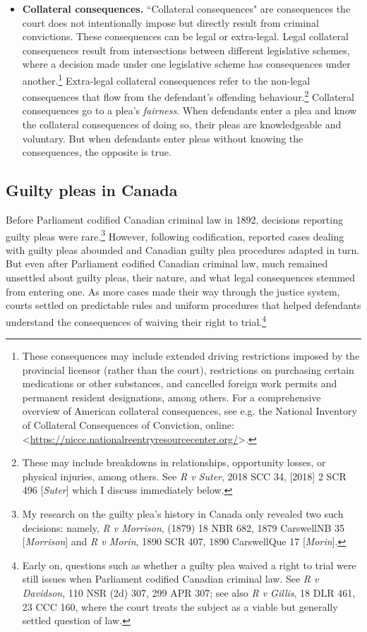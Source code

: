 \begin{itemize}
\item \textbf{Collateral consequences.} ``Collateral consequences" are consequences the court does not intentionally impose but directly result from criminal convictions. These consequences can be legal or extra-legal. Legal collateral consequences result from intersections between different legislative schemes, where a decision made under one legislative scheme has consequences under another.\footnote{These consequences may include extended driving restrictions imposed by the provincial licensor (rather than the court), restrictions on purchasing certain medications or other substances, and cancelled foreign work permits and permanent resident designations, among others. For a comprehensive overview of American collateral consequences, see e.g. the National Inventory of Collateral Consequences of Conviction, online: \textless \url{https://niccc.nationalreentryresourcecenter.org/}\textgreater.} Extra-legal collateral consequences refer to the non-legal consequences that flow from the defendant's offending behaviour.\footnote{These may include breakdowns in relationships, opportunity losses, or physical injuries, among others. See \textit{R v Suter}, 2018 SCC 34, [2018] 2 SCR 496 [\textit{Suter}] which I discuss immediately below.} Collateral consequences go to a plea's \textit{fairness}. When defendants enter a plea and know the collateral consequences of doing so, their pleas are knowledgeable and voluntary. But when defendants enter pleas without knowing the consequences, the opposite is true.
\end{itemize}

\subsection{Guilty pleas in Canada}

Before Parliament codified Canadian criminal law in 1892, decisions reporting guilty pleas were rare.\footnote{My research on the guilty plea's history in Canada only revealed two such decisions: namely, \textit{R v Morrison}, (1879) 18 NBR 682, 1879 CarswellNB 35 [\textit{Morrison}] and \textit{R v Morin}, 1890 SCR 407, 1890 CarswellQue 17 [\textit{Morin}].} However, following codification, reported cases dealing with guilty pleas abounded and Canadian guilty plea procedures adapted in turn. But even after Parliament codified Canadian criminal law, much remained unsettled about guilty pleas, their nature, and what legal consequences stemmed from entering one. As more cases made their way through the justice system, courts settled on predictable rules and uniform procedures that helped defendants understand the consequences of waiving their right to trial.\footnote{Early on, questions such as whether a guilty plea waived a right to trial were still issues when Parliament codified Canadian criminal law. See \textit{R v Davidson}, 110 NSR (2d) 307, 299 APR 307; see also \textit{R v Gillis}, 18 DLR 461, 23 CCC 160, where the court treats the subject as a viable but generally settled question of law.}

